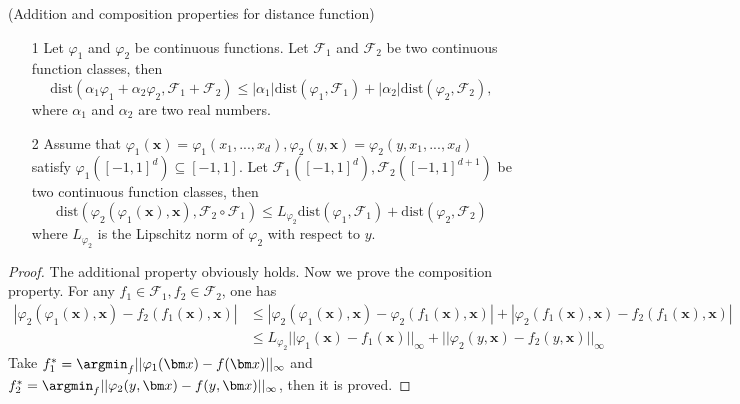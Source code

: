 \begin{properties}\label{prop:dis}
(Addition and composition properties for distance function)
\begin{itemize}
\item[1] Let $\varphi_1$ and $\varphi_2$ be continuous functions. Let $\mathcal F_{1}$ and $\mathcal F_2$ be two continuous function classes, then 
$$
\mbox{dist}(\alpha_{1}\varphi_1+\alpha_{2}\varphi_2,\mathcal{F}_1+\mathcal F_2)\le |\alpha_1|\mbox{dist}(\varphi_1,\mathcal F_1) + |\alpha_2|\mbox{dist}(\varphi_2,\mathcal F_2),
$$
where $\alpha_1$ and $\alpha_2$ are two real numbers.
\item[2] Assume that $\varphi_1(\bm x) = \varphi_1(x_1,...,x_d),\varphi_2(y,\bm x) = \varphi_2(y,x_1,...,x_d)$ satisfy $\varphi_1([-1,1]^d)\subseteq[-1,1]$. Let $\mathcal F_1([-1,1]^d),\mathcal F_2([-1,1]^{d+1})$ be two continuous function classes, then
$$
\mbox{dist}(\varphi_2(\varphi_1(\bm x),\bm x),\mathcal F_2\circ \mathcal F_1)\le L_{\varphi_2}\mbox{dist}(\varphi_1,\mathcal F_1) +\mbox{dist}(\varphi_2,\mathcal F_2)
$$
where $L_{\varphi_2}$ is the Lipschitz norm of $\varphi_2$ with respect to $y$.
\end{itemize}
\end{properties}
\begin{proof}
The additional property obviously holds. Now we prove the composition property. For any $f_1\in\mathcal F_1,f_2\in \mathcal F_2$, one has
\[
\begin{split}
|\varphi_2(\varphi_1(\bm x),\bm x) - f_2(f_1(\bm x),\bm x)|&\le |\varphi_2(\varphi_1(\bm x),\bm x) - \varphi_2(f_1(\bm x),\bm x)|+|\varphi_2(f_1(\bm x),\bm x)-f_2(f_1(\bm x),\bm x)|\\
& \le L_{\varphi_2} ||\varphi_1(\bm x) -f_1(\bm x)||_\infty +||\varphi_2(y,\bm x) - f_2(y,\bm x)||_\infty
\end{split}
\]
Take $f_1^* = \argmin_f ||\varphi_1(\bm x) - f(\bm x)||_\infty$ and $f_2^* = \argmin_f ||\varphi_2(y,\bm x) - f(y,\bm x)||_\infty$, then it is proved.
\end{proof}

